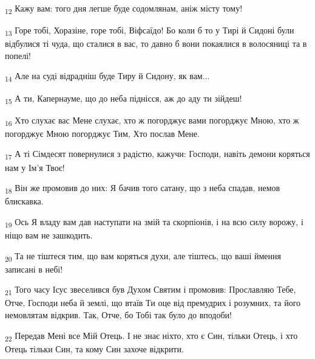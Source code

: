 \begin{tcolorbox}
\textsubscript{12} Кажу вам: того дня легше буде содомлянам, аніж місту тому!
\end{tcolorbox}
\begin{tcolorbox}
\textsubscript{13} Горе тобі, Хоразіне, горе тобі, Віфсаїдо! Бо коли б то у Тирі й Сидоні були відбулися ті чуда, що сталися в вас, то давно б вони покаялися в волосяниці та в попелі!
\end{tcolorbox}
\begin{tcolorbox}
\textsubscript{14} Але на суді відрадніш буде Тиру й Сидону, як вам...
\end{tcolorbox}
\begin{tcolorbox}
\textsubscript{15} А ти, Капернауме, що до неба піднісся, аж до аду ти зійдеш!
\end{tcolorbox}
\begin{tcolorbox}
\textsubscript{16} Хто слухає вас Мене слухає, хто ж погорджує вами погорджує Мною, хто ж погорджує Мною погорджує Тим, Хто послав Мене.
\end{tcolorbox}
\begin{tcolorbox}
\textsubscript{17} А ті Сімдесят повернулися з радістю, кажучи: Господи, навіть демони коряться нам у Ім'я Твоє!
\end{tcolorbox}
\begin{tcolorbox}
\textsubscript{18} Він же промовив до них: Я бачив того сатану, що з неба спадав, немов блискавка.
\end{tcolorbox}
\begin{tcolorbox}
\textsubscript{19} Ось Я владу вам дав наступати на змій та скорпіонів, і на всю силу ворожу, і ніщо вам не зашкодить.
\end{tcolorbox}
\begin{tcolorbox}
\textsubscript{20} Та не тіштеся тим, що вам коряться духи, але тіштесь, що ваші ймення записані в небі!
\end{tcolorbox}
\begin{tcolorbox}
\textsubscript{21} Того часу Ісус звеселився був Духом Святим і промовив: Прославляю Тебе, Отче, Господи неба й землі, що втаїв Ти оце від премудрих і розумних, та його немовлятам відкрив. Так, Отче, бо Тобі так було до вподоби!
\end{tcolorbox}
\begin{tcolorbox}
\textsubscript{22} Передав Мені все Мій Отець. І не знає ніхто, хто є Син, тільки Отець, і хто Отець тільки Син, та кому Син захоче відкрити.
\end{tcolorbox}
